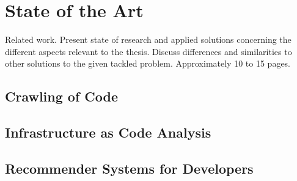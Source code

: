 \chapter{State of the Art}
Related work. Present state of research and applied solutions concerning the different aspects relevant to the thesis. Discuss differences and similarities to other solutions to the given tackled problem. Approximately 10 to 15 pages.


\section{Crawling of Code}
\section{Infrastructure as Code Analysis}
\section{Recommender Systems for Developers}